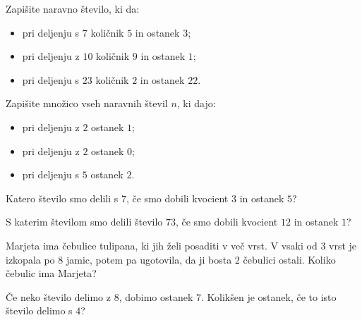             \begin{naloga}
                Zapišite naravno število, ki da:
                \begin{itemize}
                    \item pri deljenju s $7$ količnik $5$ in ostanek $3$; 
                    \item pri deljenju z $10$ količnik $9$ in ostanek $1$; 
                    \item pri deljenju s $23$ količnik $2$ in ostanek $22$. 
                \end{itemize}
            \end{naloga}

            \begin{naloga}
                Zapišite množico vseh naravnih števil $n$, ki dajo:
                \begin{itemize}
                    \item pri deljenju z $2$ ostanek $1$; 
                    \item pri deljenju z $2$ ostanek $0$; 
                    \item pri deljenju s $5$ ostanek $2$. 
                \end{itemize}
            \end{naloga}
        

        
            \begin{naloga}
                Katero število smo delili s $7$, če smo dobili kvocient $3$ in ostanek $5$? 
            \end{naloga}

            \begin{naloga}
                S katerim številom smo delili število $73$, če smo dobili kvocient $12$ in ostanek $1$? 
            \end{naloga}

            \begin{naloga}
                Marjeta ima čebulice tulipana, ki jih želi posaditi v več vrst. 
                V vsaki od $3$ vrst je izkopala po $8$ jamic, potem pa ugotovila, da ji bosta $2$ čebulici ostali.
                Koliko čebulic ima Marjeta?  
            \end{naloga}
        

        
            \begin{naloga}
                Če neko število delimo z $8$, dobimo ostanek $7$. Kolikšen je ostanek, če to isto število delimo s $4$? 
            \end{naloga}

